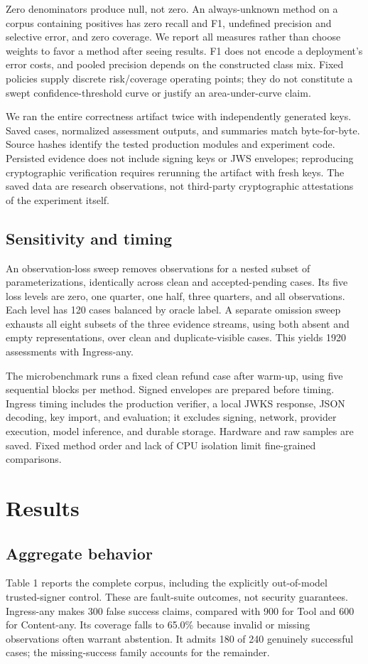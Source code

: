 \documentclass[11pt]{article}
\begin{document}
Zero denominators produce null, not zero. An always-unknown method on a corpus containing positives has zero recall and F1, undefined precision and selective error, and zero coverage. We report all measures rather than choose weights to favor a method after seeing results. F1 does not encode a deployment's error costs, and pooled precision depends on the constructed class mix. Fixed policies supply discrete risk/coverage operating points; they do not constitute a swept confidence-threshold curve or justify an area-under-curve claim.

We ran the entire correctness artifact twice with independently generated keys. Saved cases, normalized assessment outputs, and summaries match byte-for-byte. Source hashes identify the tested production modules and experiment code. Persisted evidence does not include signing keys or JWS envelopes; reproducing cryptographic verification requires rerunning the artifact with fresh keys. The saved data are research observations, not third-party cryptographic attestations of the experiment itself.

\subsection{Sensitivity and timing}
An observation-loss sweep removes observations for a nested subset of parameterizations, identically across clean and accepted-pending cases. Its five loss levels are zero, one quarter, one half, three quarters, and all observations. Each level has 120 cases balanced by oracle label. A separate omission sweep exhausts all eight subsets of the three evidence streams, using both absent and empty representations, over clean and duplicate-visible cases. This yields 1920 assessments with Ingress-any.

The microbenchmark runs a fixed clean refund case after warm-up, using five sequential blocks per method. Signed envelopes are prepared before timing. Ingress timing includes the production verifier, a local JWKS response, JSON decoding, key import, and evaluation; it excludes signing, network, provider execution, model inference, and durable storage. Hardware and raw samples are saved. Fixed method order and lack of CPU isolation limit fine-grained comparisons.

\section{Results}
\subsection{Aggregate behavior}
Table 1 reports the complete corpus, including the explicitly out-of-model trusted-signer control. These are fault-suite outcomes, not security guarantees. Ingress-any makes 300 false success claims, compared with 900 for Tool and 600 for Content-any. Its coverage falls to 65.0\% because invalid or missing observations often warrant abstention. It admits 180 of 240 genuinely successful cases; the missing-success family accounts for the remainder.
\end{document}
